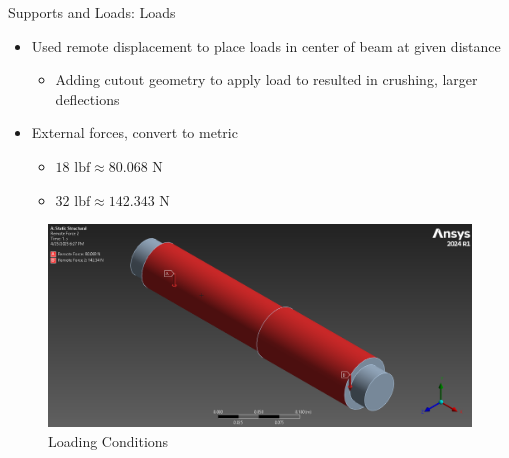 \documentclass[11pt]{beamer}
\begin{document}
    \begin{frame}{Supports and Loads: Loads}
        \begin{itemize}
            \item Used remote displacement to place loads in center of beam at given distance
                \begin{itemize} 
                    \item Adding cutout geometry to apply load to resulted in crushing, larger deflections
                \end{itemize}
            \item External forces, convert to metric
                \begin{itemize}
                    \item $ 18 \textrm{ lbf} \approx 80.068 \textrm{ N}  $
                    \item $ 32 \textrm{ lbf} \approx 142.343 \textrm{ N} $
                \end{itemize}
        \end{itemize}
        \begin{figure}
            \centering
            \includegraphics[scale=0.20]{figs/forces_iso.png}
            \caption{Loading Conditions}
        \end{figure}
    \end{frame}
\end{document}
